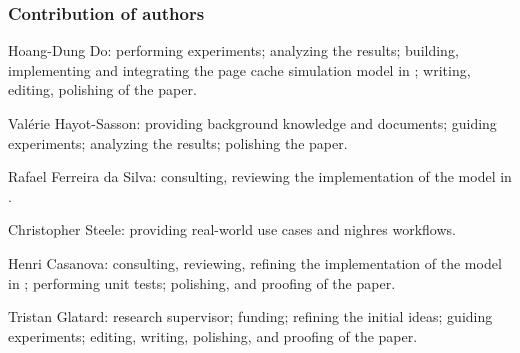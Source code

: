 \subsubsection{Contribution of authors}

\noindent Hoang-Dung Do: performing experiments; analyzing the results; building, 
implementing and integrating the page cache simulation model in \wrench; 
writing, editing, polishing of the paper.

\noindent Val\'erie Hayot-Sasson: providing background knowledge and documents; 
guiding experiments; analyzing the results; polishing the paper.

\noindent Rafael Ferreira da Silva: consulting, reviewing the implementation of the model 
in \wrench.

\noindent Christopher Steele: providing real-world use cases and nighres workflows.

\noindent Henri Casanova: consulting, reviewing, refining the implementation of the 
model in \wrench ; performing unit tests; polishing, and proofing of the paper.

\noindent Tristan Glatard: research supervisor; funding; refining the initial ideas; 
guiding experiments; editing, writing, polishing, and proofing of the paper.